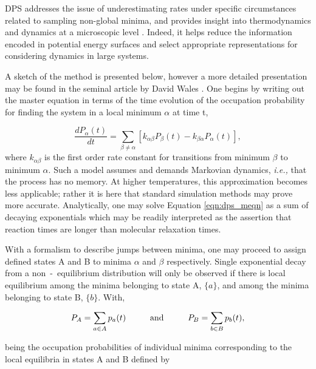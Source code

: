 DPS addresses the issue of underestimating rates under specific circumstances related to sampling non-global minima, and provides insight into thermodynamics and dynamics at a microscopic level \cite{10.1063/1.1484389}. Indeed, it helps reduce the information encoded in potential energy surfaces and select appropriate representations for considering dynamics in large systems.

A sketch of the method is presented below, however a more detailed presentation may be found in the seminal article by David Wales \cite{doi:10.1080/00268970210162691}. One begins by writing out the master equation in terms of the time evolution of the occupation probability for finding the system in a local minimum $\alpha$ at time t,

\begin{equation}
    \frac{d P_{\alpha}(t)}{dt} = \sum_{\beta\neq\alpha} \left[ k_{\alpha\beta}P_{\beta}(t) - k_{\beta\alpha}P_{\alpha}(t) \right], 
    \label{eqn:dps_meqn}
\end{equation}
where $k_{\alpha\beta}$ is the first order rate constant for transitions from minimum $\beta$ to minimum $\alpha$. Such a model assumes and demands Markovian dynamics, \textit{i.e.,} that the process has no memory. At higher temperatures, this approximation becomes less applicable; rather it is here that standard simulation methods may prove more accurate. Analytically, one may solve Equation \ref{eqn:dps_meqn} as a sum of decaying exponentials which may be readily interpreted as the assertion that reaction times are longer than molecular relaxation times. 

With a formalism to describe jumps between minima, one may proceed to assign defined states A and B to minima $\alpha$ and $\beta$ respectively. Single exponential decay from a non~-~equilibrium distribution will only be observed if there is local equilibrium among the minima belonging to state A, $\lbrace a \rbrace$, and among the minima belonging to state B, $\lbrace b \rbrace$. With,

\begin{equation}
    P_{A} = \sum_{a\in A}p_{a}(t) \hspace{1.0cm} \text{and} \hspace{1.0cm} P_{B} = \sum_{b\in B}p_{b}(t),
    \label{eqn:occ_prob_dps}
\end{equation}

being the occupation probabilities of individual minima corresponding to the local equilibria in states A and B defined by 

